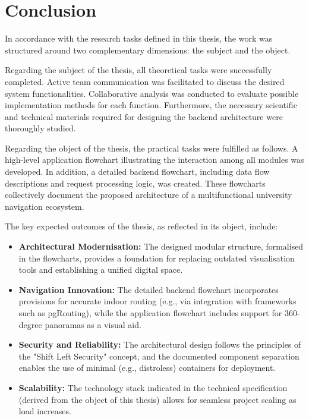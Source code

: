 \documentclass[a4paper, 14pt]{extreport}
\begin{document}
\chapter{Conclusion}

In accordance with the research tasks defined in this thesis, the work was structured around two complementary dimensions: the subject and the object.

Regarding the subject of the thesis, all theoretical tasks were successfully completed. Active team communication was facilitated to discuss the desired system functionalities. Collaborative analysis was conducted to evaluate possible implementation methods for each function. Furthermore, the necessary scientific and technical materials required for designing the backend architecture were thoroughly studied.

Regarding the object of the thesis, the practical tasks were fulfilled as follows. A high-level application flowchart illustrating the interaction among all modules was developed. In addition, a detailed backend flowchart, including data flow descriptions and request processing logic, was created. These flowcharts collectively document the proposed architecture of a multifunctional university navigation ecosystem.

The key expected outcomes of the thesis, as reflected in its object, include:
\begin{itemize}
	\item \textbf{Architectural Modernisation:} The designed modular structure, formalised in the flowcharts, provides a foundation for replacing outdated visualisation tools and establishing a unified digital space.
	\item \textbf{Navigation Innovation:} The detailed backend flowchart incorporates provisions for accurate indoor routing (e.g., via integration with frameworks such as pgRouting), while the application flowchart includes support for 360-degree panoramas as a visual aid.
	\item \textbf{Security and Reliability:} The architectural design follows the principles of the "Shift Left Security" concept, and the documented component separation enables the use of minimal (e.g., distroless) containers for deployment.
	\item \textbf{Scalability:} The technology stack indicated in the technical specification (derived from the object of this thesis) allows for seamless project scaling as load increases.
\end{itemize}
\end{document}
